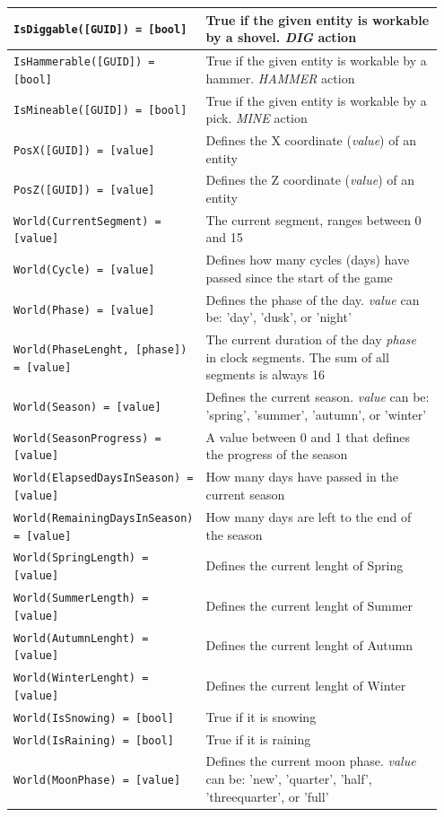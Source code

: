 \begin{table}[htb]
\begin{tabular}{ | p{0.35\linewidth} | p{0.6\linewidth} | }
        \texttt{IsDiggable([GUID]) = [bool]} & True if the given entity is workable by a shovel. \textit{DIG} action \\ \hline 
        \texttt{IsHammerable([GUID]) = [bool]} & True if the given entity is workable by a hammer. \textit{HAMMER} action \\ \hline 
        \texttt{IsMineable([GUID]) = [bool]} & True if the given entity is workable by a pick. \textit{MINE} action \\ \hline 
        \texttt{PosX([GUID]) = [value]} & Defines the X coordinate (\textit{value}) of an entity \\ \hline 
        \texttt{PosZ([GUID]) = [value]} & Defines the Z coordinate (\textit{value}) of an entity \\ \hline 
        \texttt{World(CurrentSegment) = [value]} & The current segment, ranges between 0 and 15 \\ \hline 
        \texttt{World(Cycle) = [value]} & Defines how many cycles (days) have passed since the start of the game \\ \hline 
        \texttt{World(Phase) = [value]} & Defines the phase of the day. \textit{value} can be: 'day', 'dusk', or 'night' \\ \hline 
        \texttt{World(PhaseLenght, [phase]) = [value]} & The current duration of the day \textit{phase} in clock segments. The sum of all segments is always 16 \\ \hline 
        \texttt{World(Season) = [value]} & Defines the current season. \textit{value} can be: 'spring', 'summer', 'autumn', or 'winter' \\ \hline 
        \texttt{World(SeasonProgress) = [value]} & A value between 0 and 1 that defines the progress of the season \\ \hline 
        \texttt{World(ElapsedDaysInSeason) = [value]} & How many days have passed in the current season \\ \hline 
        \texttt{World(RemainingDaysInSeason) = [value]} & How many days are left to the end of the season \\ \hline 
        \texttt{World(SpringLength) = [value]} & Defines the current lenght of Spring \\ \hline 
        \texttt{World(SummerLength) = [value]} & Defines the current lenght of Summer \\ \hline 
        \texttt{World(AutumnLenght) = [value]} & Defines the current lenght of Autumn \\ \hline 
        \texttt{World(WinterLenght) = [value]} & Defines the current lenght of Winter \\ \hline 
        \texttt{World(IsSnowing) = [bool]} & True if it is snowing \\ \hline 
        \texttt{World(IsRaining) = [bool]} & True if it is raining \\ \hline 
        \texttt{World(MoonPhase) = [value]} & Defines the current moon phase. \textit{value} can be: 'new', 'quarter', 'half', 'threequarter', or 'full' \\ \hline 
	\end{tabular}
\end{table}

